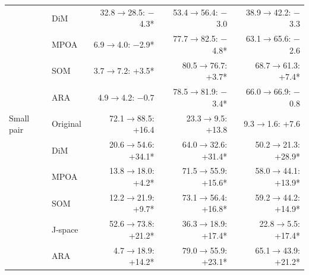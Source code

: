 \begin{table}[t]
\begin{tabular}{@{}llrrr@{}}
 & DiM & 32.8$\to$28.5: $-$4.3* & 53.4$\to$56.4: $-$3.0 & 38.9$\to$42.2: $-$3.3 \\
 & MPOA & 6.9$\to$4.0: $-$2.9* & 77.7$\to$82.5: $-$4.8* & 63.1$\to$65.6: $-$2.6 \\
 & SOM & 3.7$\to$7.2: +3.5* & 80.5$\to$76.7: +3.7* & 68.7$\to$61.3: +7.4* \\
 & ARA & 4.9$\to$4.2: $-$0.7 & 78.5$\to$81.9: $-$3.4* & 66.0$\to$66.9: $-$0.8 \\
\midrule
Small pair & Original & 72.1$\to$88.5: +16.4 & 23.3$\to$9.5: +13.8 & 9.3$\to$1.6: +7.6 \\
 & DiM & 20.6$\to$54.6: +34.1* & 64.0$\to$32.6: +31.4* & 50.2$\to$21.3: +28.9* \\
 & MPOA & 13.8$\to$18.0: +4.2* & 71.5$\to$55.9: +15.6* & 58.0$\to$44.1: +13.9* \\
 & SOM & 12.2$\to$21.9: +9.7* & 73.1$\to$56.4: +16.8* & 59.2$\to$44.2: +14.9* \\
 & J-space & 52.6$\to$73.8: +21.2* & 36.3$\to$18.9: +17.4* & 22.8$\to$5.5: +17.4* \\
 & ARA & 4.7$\to$18.9: +14.2* & 79.0$\to$55.9: +23.1* & 65.1$\to$43.9: +21.2* \\
\bottomrule
\end{tabular}
\end{table}
